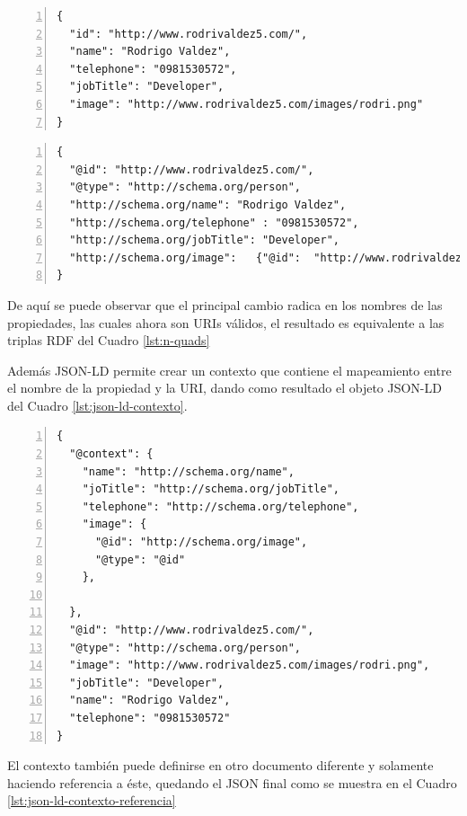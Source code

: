 \lstset{language=json}  

\noindent\begin{minipage}{\textwidth}
\begin{lstlisting}[captionpos=b, caption=Ejemplo de un documento JSON, label=lst:json,  numbers=left,  numberstyle=\tiny\color{mygray},frame=single]
{
  "id": "http://www.rodrivaldez5.com/",
  "name": "Rodrigo Valdez",
  "telephone": "0981530572",
  "jobTitle": "Developer",
  "image": "http://www.rodrivaldez5.com/images/rodri.png"
}
\end{lstlisting}
\end{minipage}

\noindent\begin{minipage}{\textwidth}
\begin{lstlisting}[captionpos=b, caption=Ejemplo de un documento JSON-LD, label=lst:json-ld,  numbers=left,  numberstyle=\tiny\color{mygray},frame=single]
{
  "@id": "http://www.rodrivaldez5.com/",
  "@type": "http://schema.org/person",
  "http://schema.org/name": "Rodrigo Valdez",
  "http://schema.org/telephone" : "0981530572",
  "http://schema.org/jobTitle": "Developer",
  "http://schema.org/image":   {"@id":  "http://www.rodrivaldez5.com/images/rodri.png"} 
}
\end{lstlisting}
\end{minipage}
De aquí se puede observar que el principal cambio radica en los nombres de las propiedades, las cuales ahora son URIs válidos, el resultado es equivalente a las triplas RDF del Cuadro \ref{lst:n-quads}

Además JSON-LD permite crear un contexto que contiene el mapeamiento entre el nombre de la propiedad y la URI, dando como resultado el objeto JSON-LD del Cuadro \ref{lst:json-ld-contexto}. \hfill \break

\noindent\begin{minipage}{\textwidth}
\begin{lstlisting}[captionpos=b, caption=Ejemplo de un documento JSON-LD con Contexto, label=lst:json-ld-contexto,  numbers=left,  numberstyle=\tiny\color{mygray},frame=single]
{
  "@context": {
    "name": "http://schema.org/name",  
    "joTitle": "http://schema.org/jobTitle",  
    "telephone": "http://schema.org/telephone",  
    "image": {
      "@id": "http://schema.org/image",  
      "@type": "@id"  
    },
  
  },
  "@id": "http://www.rodrivaldez5.com/",
  "@type": "http://schema.org/person",
  "image": "http://www.rodrivaldez5.com/images/rodri.png",
  "jobTitle": "Developer",
  "name": "Rodrigo Valdez",
  "telephone": "0981530572"
}
\end{lstlisting}
\end{minipage}
El contexto también puede definirse en otro documento diferente y solamente haciendo referencia a éste, quedando el JSON final como se muestra en el Cuadro \ref{lst:json-ld-contexto-referencia}

